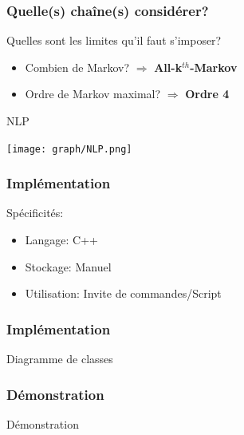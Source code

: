 \documentclass{beamer}
\begin{document}
            \begin{frame}
                \frametitle{Quelle(s) chaîne(s) considérer?}
                Quelles sont les limites qu'il faut s'imposer?
                \begin{itemize}
                    \pause[2]
                    \item Combien de Markov? \pause[3] $\Rightarrow$ \textbf{All-k}$^{th}$\textbf{-Markov}
                    \pause[4]
                    \item Ordre de Markov maximal? \pause[6] $\Rightarrow$ \textbf{Ordre 4}
                    \pause[5]
                \end{itemize}
                \begin{exampleblock}{NLP}
                    \begin{center}
                        \texttt{[image: graph/NLP.png]}
                    \end{center}
                \end{exampleblock}
            \end{frame}
            \begin{frame}
                \frametitle{Implémentation}
                Spécificités:
                \begin{itemize}
                    \pause
                    \item Langage: \pause C++
                    \pause
                    \item Stockage: \pause Manuel
                    \pause
                    \item Utilisation: \pause Invite de commandes/Script
                \end{itemize}
            \end{frame}
            \begin{frame}
                \frametitle{Implémentation}
                \begin{block}{Diagramme de classes}
                    \begin{center}
                        \pause[2]
                    \end{center}
                \end{block}
            \end{frame}
            \begin{frame}
                \frametitle{Démonstration}
                \begin{center}
                    Démonstration
                \end{center}
            \end{frame}
\end{document}
